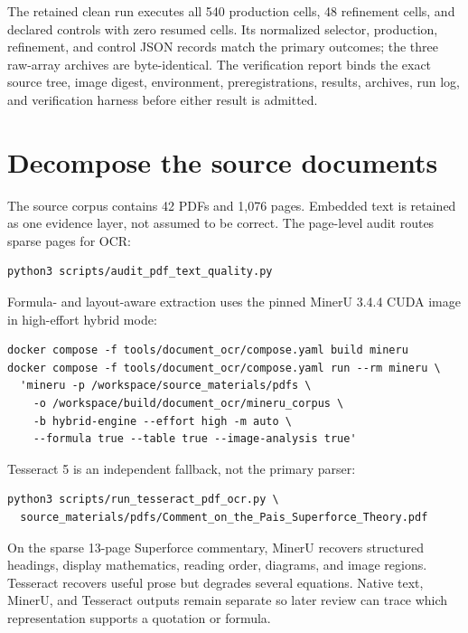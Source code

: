 The retained clean run executes all 540 production cells, 48 refinement cells,
and declared controls with zero resumed cells. Its normalized selector,
production, refinement, and control JSON records match the primary outcomes;
the three raw-array archives are byte-identical. The verification report binds
the exact source tree, image digest, environment, preregistrations, results,
archives, run log, and verification harness before either result is admitted.


\section{Decompose the source documents}

The source corpus contains 42 PDFs and 1,076 pages. Embedded text is retained as
one evidence layer, not assumed to be correct. The page-level audit routes
sparse pages for OCR:

\begin{verbatim}
python3 scripts/audit_pdf_text_quality.py
\end{verbatim}

Formula- and layout-aware extraction uses the pinned MinerU 3.4.4 CUDA image in
high-effort hybrid mode:

\begin{verbatim}
docker compose -f tools/document_ocr/compose.yaml build mineru
docker compose -f tools/document_ocr/compose.yaml run --rm mineru \
  'mineru -p /workspace/source_materials/pdfs \
    -o /workspace/build/document_ocr/mineru_corpus \
    -b hybrid-engine --effort high -m auto \
    --formula true --table true --image-analysis true'
\end{verbatim}

Tesseract 5 is an independent fallback, not the primary parser:

\begin{verbatim}
python3 scripts/run_tesseract_pdf_ocr.py \
  source_materials/pdfs/Comment_on_the_Pais_Superforce_Theory.pdf
\end{verbatim}

On the sparse 13-page Superforce commentary, MinerU recovers structured
headings, display mathematics, reading order, diagrams, and image regions.
Tesseract recovers useful prose but degrades several equations. Native text,
MinerU, and Tesseract outputs remain separate so later review can trace which
representation supports a quotation or formula.

